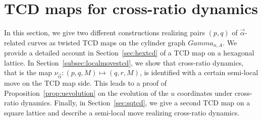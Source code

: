 \documentclass[10pt,a4paper]{amsart}
\numberwithin{equation}{section}
\newcommand{\A}{{\mathbb A}}
\def\A{A}
\def\Gamma{Gamma}
\def\widehat#1{#1}
\begin{document}
\section{TCD maps for cross-ratio dynamics} \label{sec:crtcd12}
In this section, we give two different constructions realizing pairs $(p,q)$ of $\vec\alpha$-related curves as twisted TCD maps on the cylinder graph {$\Gamma_{n,\widehat\A}$}. We provide a detailed account in Section~\ref{sec:hextcd} of a TCD map on a hexagonal lattice. In Section~\ref{subsec:localmovestcd}, we show that cross-ratio dynamics, that is the map $\nu_{\vec \alpha}\colon (p,q,M) \mapsto (q,r,M)$, is identified with a certain semi-local move on the TCD map side. This leads to a proof of Proposition~\ref{prop:uevolution} on the evolution of the $u$ coordinates under cross-ratio dynamics. Finally, in Section~\ref{sec:sqtcd}, we give a second TCD map on a square lattice and describe a semi-local move realizing cross-ratio dynamics.
	
\end{document}
